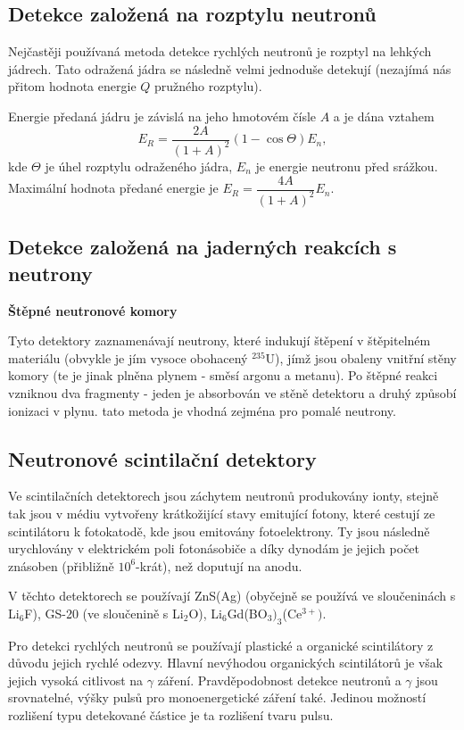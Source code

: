 \documentclass[../../main.tex]{subfiles}
\begin{document}
\subsection{Detekce založená na rozptylu neutronů}

Nejčastěji používaná metoda detekce rychlých neutronů je rozptyl na lehkých jádrech. Tato odražená jádra se následně velmi jednoduše detekují (nezajímá nás přitom hodnota energie $Q$ pružného rozptylu). 

Energie předaná jádru je závislá na jeho hmotovém čísle $A$ a je dána vztahem
\begin{equation}
E_R = \dfrac{2A}{(1+A)^2}(1 - \cos \varTheta)E_n,
\end{equation}
kde $\varTheta$ je úhel rozptylu odraženého jádra, $E_n$ je energie neutronu před srážkou. Maximální hodnota předané energie je $E_R = \dfrac{4A}{(1+A)^2}E_n. $

\subsection{Detekce založená na jaderných reakcích s neutrony}

\textbf{Štěpné neutronové komory}

Tyto detektory zaznamenávají neutrony, které indukují štěpení v štěpitelném materiálu (obvykle je jím vysoce obohacený $^{235}$U), jímž jsou obaleny vnitřní stěny komory (te je jinak plněna plynem - směsí argonu a metanu). Po štěpné reakci vzniknou dva fragmenty - jeden je absorbován ve stěně detektoru a druhý způsobí ionizaci v plynu. tato metoda je vhodná zejména pro pomalé neutrony.

\subsection{Neutronové scintilační detektory}

Ve scintilačních detektorech jsou záchytem neutronů produkovány ionty, stejně tak jsou v médiu vytvořeny krátkožijící stavy emitující fotony, které cestují ze scintilátoru k fotokatodě, kde jsou emitovány fotoelektrony. Ty jsou následně urychlovány v elektrickém poli fotonásobiče a díky dynodám je jejich počet znásoben (přibližně $10^6 $-krát), než doputují na anodu.

V těchto detektorech se používají ZnS(Ag) (obyčejně se používá ve sloučeninách s Li$_6$F), GS-20 (ve sloučenině s Li$_2$O), Li$_6$Gd(BO$_3)_3$(Ce$^{3+})$.

Pro detekci rychlých neutronů se používají plastické a organické scintilátory z důvodu jejich rychlé odezvy. Hlavní nevýhodou organických scintilátorů je však jejich vysoká citlivost na $\gamma$ záření. Pravděpodobnost detekce neutronů a $\gamma$ jsou srovnatelné, výšky pulsů pro monoenergetické záření také. Jedinou možností rozlišení typu detekované částice je ta rozlišení tvaru pulsu.
\end{document}
